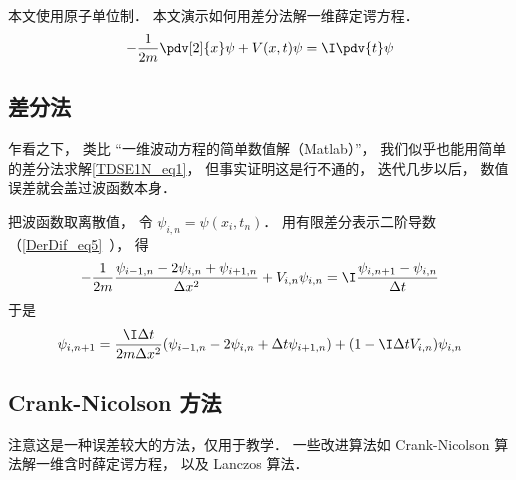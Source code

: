 
\begin{issues}
\issueDraft
\end{issues}


本文使用原子单位制． 本文演示如何用差分法解一维薛定谔方程．
\begin{equation}\label{TDSE1N_eq1}
-\frac{1}{2m}\pdv[2]{x}\psi + V(x,t)\psi = \I\pdv{t}\psi
\end{equation}

\subsection{差分法}
乍看之下， 类比 “一维波动方程的简单数值解（Matlab）”， 我们似乎也能用简单的差分法求解\autoref{TDSE1N_eq1}， 但事实证明这是行不通的， 迭代几步以后， 数值误差就会盖过波函数本身．

把波函数取离散值， 令 $\psi_{i,n} = \psi(x_i,t_n)$． 用有限差分表示二阶导数（\autoref{DerDif_eq5}~）， 得
\begin{equation}
-\frac{1}{2m}\frac{\psi_{i-1,n} - 2\psi_{i,n} + \psi_{i+1,n}}{\Delta x^2} + V_{i,n}\psi_{i,n} = \I \frac{\psi_{i, n+1} - \psi_{i, n}}{\Delta t}
\end{equation}
于是
\begin{equation}
\psi_{i, n+1} = \frac{\I\Delta t}{2m\Delta x^2} (\psi_{i-1,n} - 2\psi_{i,n} + \Delta t\psi_{i+1,n}) + (1-\I \Delta t V_{i,n})\psi_{i,n}
\end{equation}

\subsection{Crank-Nicolson 方法}
注意这是一种误差较大的方法，仅用于教学． 一些改进算法如 Crank-Nicolson 算法解一维含时薛定谔方程， 以及 Lanczos 算法．
